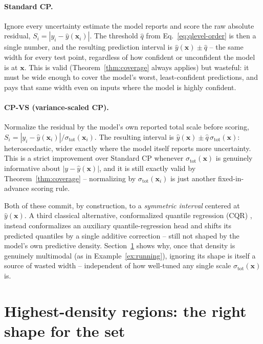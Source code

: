 \documentclass[11pt]{article}
\begin{document}
\paragraph{Standard CP.} Ignore every uncertainty estimate the model reports and score the raw
absolute residual, $S_i = |y_i - \hat y(\bm x_i)|$. The threshold $\hat q$ from
Eq.~\eqref{eq:qlevel-order} is then a single number, and the resulting prediction interval is
$\hat y(\bm x) \pm \hat q$ -- the same width for every test point, regardless of how confident or
unconfident the model is at $\bm x$. This is valid (Theorem~\ref{thm:coverage} always applies) but
wasteful: it must be wide enough to cover the model's worst, least-confident predictions, and pays
that same width even on inputs where the model is highly confident.

\paragraph{CP-VS (variance-scaled CP).} Normalize the residual by the model's own reported total
scale before scoring, $S_i = |y_i - \hat y(\bm x_i)| / \sigma_{\mathrm{tot}}(\bm x_i)$. The
resulting interval is $\hat y(\bm x) \pm \hat q\, \sigma_{\mathrm{tot}}(\bm x)$: heteroscedastic,
wider exactly where the model itself reports more uncertainty. This is a strict improvement over
Standard CP whenever $\sigma_{\mathrm{tot}}(\bm x)$ is genuinely informative about $|y-\hat
y(\bm x)|$, and it is still exactly valid by Theorem~\ref{thm:coverage} -- normalizing by
$\sigma_{\mathrm{tot}}(\bm x_i)$ is just another fixed-in-advance scoring rule.

Both of these commit, by construction, to a \emph{symmetric interval} centered at $\hat y(\bm x)$.
A third classical alternative, conformalized quantile regression (CQR) \cite{romano2019conformalized},
instead conformalizes an auxiliary quantile-regression head and shifts its predicted quantiles by a
single additive correction -- still not shaped by the model's own predictive density. Section~\ref{sec:hpd}
shows why, once that density is genuinely multimodal (as in Example~\ref{ex:running}), ignoring its
shape is itself a source of wasted width -- independent of how well-tuned any single scale
$\sigma_{\mathrm{tot}}(\bm x)$ is.

\section{Highest-density regions: the right shape for the set}
\label{sec:hpd}
\end{document}
